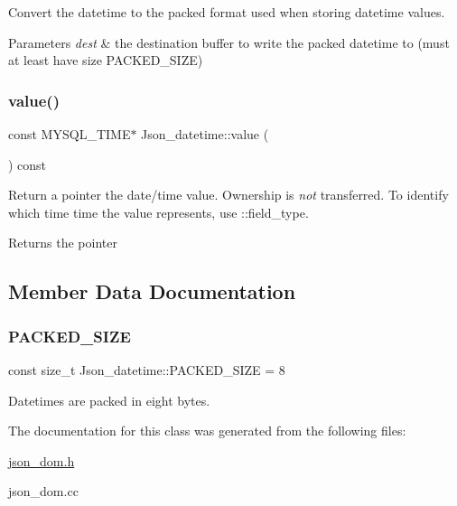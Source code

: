 Convert the datetime to the packed format used when storing datetime values. 
\begin{DoxyParams}{Parameters}
{\em dest} & the destination buffer to write the packed datetime to (must at least have size P\+A\+C\+K\+E\+D\+\_\+\+S\+I\+ZE) \\
\hline
\end{DoxyParams}
\mbox{\label{classJson__datetime_a8d94ebe1237f57e7ffd2bb82621f8f5a}} 
\subsubsection{\texorpdfstring{value()}{value()}}
{\footnotesize\ttfamily const M\+Y\+S\+Q\+L\+\_\+\+T\+I\+ME$\ast$ Json\+\_\+datetime\+::value (\begin{DoxyParamCaption}{ }\end{DoxyParamCaption}) const\hspace{0.3cm}{\ttfamily [inline]}}

Return a pointer the date/time value. Ownership is {\itshape not} transferred. To identify which time time the value represents, use \+::field\+\_\+type. \begin{DoxyReturn}{Returns}
the pointer 
\end{DoxyReturn}


\subsection{Member Data Documentation}
\mbox{\label{classJson__datetime_ac18eb9fb33e2a1cf151a7a6a748e4212}} 
\subsubsection{\texorpdfstring{P\+A\+C\+K\+E\+D\+\_\+\+S\+I\+ZE}{PACKED\_SIZE}}
{\footnotesize\ttfamily const size\+\_\+t Json\+\_\+datetime\+::\+P\+A\+C\+K\+E\+D\+\_\+\+S\+I\+ZE = 8\hspace{0.3cm}{\ttfamily [static]}}

Datetimes are packed in eight bytes. 

The documentation for this class was generated from the following files\+:\begin{DoxyCompactItemize}
\item 
\mbox{\hyperlink{json__dom_8h}{json\+\_\+dom.\+h}}\item 
json\+\_\+dom.\+cc\end{DoxyCompactItemize}
